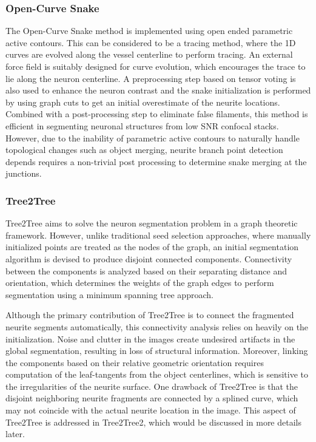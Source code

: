 \subsubsection{Open-Curve Snake}
The Open-Curve Snake method\cite{wang_Roysam_open_curve,cai_ISBI} is implemented using open ended parametric active contours. This can be considered to be a tracing method, where the 1D curves are evolved along the vessel centerline to perform tracing. An external force field is suitably designed for curve evolution, which encourages the trace to lie along the neuron centerline. A preprocessing step based on tensor voting \cite{roysam_tensorvoting} is also used to enhance the neuron contrast and the snake initialization is performed by using graph cuts\cite{graph_cut} to get an initial overestimate of the neurite locations. Combined with a post-processing step to eliminate false filaments, this method is efficient in segmenting neuronal structures from low SNR confocal stacks. However, due to the inability of parametric active contours to naturally handle topological changes such as object merging, neurite branch point detection depends requires a non-trivial post processing to determine snake merging at the junctions.
 
\subsubsection{Tree2Tree}
Tree2Tree \cite{basu_T2T_journal} aims to solve the neuron segmentation problem in a graph theoretic framework. However, unlike traditional seed selection approaches, where manually initialized points are treated as the nodes of the graph, an initial segmentation algorithm is devised to produce disjoint connected components. Connectivity between the components is analyzed based on their separating distance and orientation, which determines the weights of the graph edges to perform segmentation using a minimum spanning tree approach. 

Although the primary contribution of Tree2Tree is to connect the fragmented neurite segments automatically, this connectivity analysis relies on heavily on the initialization. Noise and clutter in the images create undesired artifacts in the global segmentation, resulting in loss of structural information. Moreover, linking the components based on their relative geometric orientation requires computation of the leaf-tangents from the object centerlines, which is sensitive to the irregularities of the neurite surface. One drawback of Tree2Tree is that the disjoint neighboring neurite fragments are connected by a splined curve, which may not coincide with the actual neurite location in the image. This aspect of Tree2Tree is addressed in Tree2Tree2\cite{mukherjee_T2T_2}, which would be discussed in more details later.

